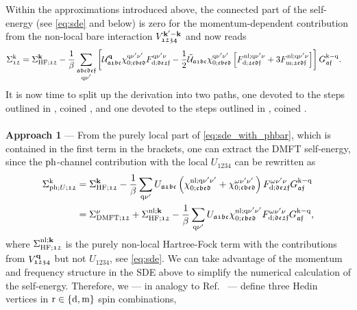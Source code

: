 \documentclass[../../main.tex]{subfiles}
\begin{document}
Within the approximations introduced above, the connected part of the self-energy (see \eqref{eq:sde} and below) is zero for the momentum-dependent contribution from the non-local bare interaction $V^{\textbf{k}'-\textbf{k}}_{\mathfrak{1234}}$ and now reads
\begin{align}\label{eq:sde_with_phbar}
	\Sigma^{\text{k}}_{\mathfrak{12}}&=\Sigma_{\text{HF};\mathfrak{12}}^{\textbf{k}} -\frac1\beta\sum_{\substack{\mathfrak{abcdef}\\\text{q}\nu'}}\left [\mathcal{U}^{\textbf{q}}_{\mathfrak{a1bc}}\chi^{\text{q}\nu'\nu'}_{0;\mathfrak{cbed}} F^{\text{q}\nu'\nu}_{\text{d};\mathfrak{de2f}}-\frac12\tilde{\mathcal{U}}_{\mathfrak{a1bc}}\chi^{\text{q}\nu'\nu'}_{0;\mathfrak{cbed}}\left [F^{\text{nl};\text{q}\nu'\nu}_{\text{d};\mathfrak{2edf}}+3 F^{\text{nl};\text{q}\nu'\nu}_{\text{m};\mathfrak{2edf}}\right ]\right ]G_{\mathfrak{af}}^{\text{k}-\text{q}}.
\end{align}
It is now time to split up the derivation into two paths, one devoted to the steps outlined in \cite{Galler2017}, coined , and one devoted to the steps outlined in \cite{Worm2023a}, coined .
\\\\
\textbf{Approach 1} --- From the purely local part of \eqref{eq:sde_with_phbar}, which is contained in the first term in the brackets, one can extract the DMFT self-energy, since the $\text{ph}$-channel contribution with the local $U_{\mathfrak{1234}}$ can be rewritten as
\begin{align}
	\Sigma_{\text{ph};U;\mathfrak{12}}^{\text{k}}&=\Sigma_{\text{HF};\mathfrak{12}}^{\textbf{k}}-\frac{1}{\beta}\sum_{\text{q}\nu'}U_{\mathfrak{a1bc}}\left (\chi^{\text{nl};\text{q}\nu'\nu'}_{0;\mathfrak{cbed}}+\chi^{\omega\nu'\nu'}_{0;\mathfrak{cbed}}\right ) F^{\omega\nu'\nu}_{\text{d};\mathfrak{de2f}} G_{\mathfrak{af}}^{\text{k}-\text{q}}\\
	&=\Sigma_{\text{DMFT};\mathfrak{12}}^{\nu}+\Sigma_{\text{HF};\mathfrak{12}}^{\text{nl};\textbf{k}}-\frac{1}{\beta}\sum_{\text{q}\nu'}U_{\mathfrak{a1bc}}\chi^{\text{nl};\text{q}\nu'\nu'}_{0;\mathfrak{cbed}}F^{\omega\nu'\nu}_{\text{d};\mathfrak{de2f}} G_{\mathfrak{af}}^{\text{k}-\text{q}},
\end{align}
where $\Sigma_{\text{HF};\mathfrak{12}}^{\text{nl};\textbf{k}}$ is the purely non-local Hartree-Fock term with the contributions from $V^{\textbf{q}}_{\mathfrak{1234}}$ but not $U_{\mathfrak{1234}}$, see \eqref{eq:sde}. We can take advantage of the momentum and frequency structure in the SDE above to simplify the numerical calculation of the self-energy. Therefore, we --- in analogy to Ref.~\cite{Galler2017} --- define three Hedin vertices in $\text{r}\in\{\text{d},\text{m}\}$ spin combinations,
\end{document}
